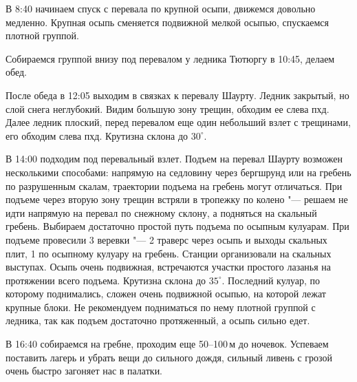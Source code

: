     В 8:40 начинаем спуск с перевала по крупной осыпи, движемся довольно медленно. Крупная осыпь сменяется подвижной
    мелкой осыпью, спускаемся плотной группой.

    Собираемся группой внизу под перевалом у ледника Тютюргу в 10:45, делаем обед.

    После обеда в 12:05 выходим в связках к перевалу Шаурту. Ледник закрытый, но слой снега неглубокий. Видим большую
    зону трещин, обходим ее слева пхд. Далее ледник плоский, перед перевалом еще один небольший взлет с трещинами,
    его обходим слева пхд. Крутизна склона до $30^\circ$.

    В 14:00 подходим под перевальный взлет. Подъем на перевал Шаурту возможен несколькими способами: напрямую на
    седловину через бергшрунд или на гребень по разрушенным скалам, траектории подъема на гребень могут отличаться.
    При подъеме через вторую зону трещин встряли в тропежку по колено "--- решаем не идти напрямую на перевал по снежному
    склону, а подняться на скальный гребень. Выбираем достаточно простой путь подъема по осыпным кулуарам. При подъеме
    провесили 3 веревки "--- 2 траверс через осыпь и выходы скальных плит, 1 по осыпному кулуару на гребень. Станции
    организовали на скальных выступах. Осыпь очень подвижная, встречаются участки простого лазанья на протяжении
    всего подъема. Крутизна склона до $35^\circ$. Последний кулуар, по которому поднимались, сложен очень подвижной
    осыпью, на которой лежат крупные блоки. Не рекомендуем подниматься по нему плотной группой с ледника, так как
    подъем достаточно протяженный, а осыпь сильно едет.

    В 16:40 собираемся на гребне, проходим еще 50--100\,м до ночевок. Успеваем поставить лагерь и убрать вещи до
    сильного дождя, сильный ливень с грозой очень быстро загоняет нас в палатки.

    \FloatBarrier
    
    
    
    
    
